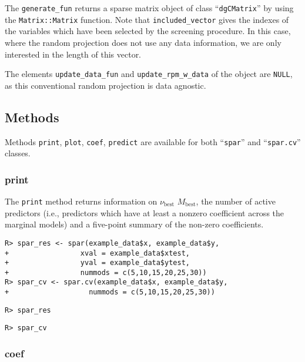 \documentclass[
  article]{jss}
\begin{document}
The \texttt{generate\_fun} returns a sparse matrix object of class
``\texttt{dgCMatrix}'' by using the \texttt{Matrix::Matrix} function.
Note that \texttt{included\_vector} gives the indexes of the variables
which have been selected by the screening procedure. In this case, where
the random projection does not use any data information, we are only
interested in the length of this vector.

The elements \texttt{update\_data\_fun} and
\texttt{update\_rpm\_w\_data} of the object are \texttt{NULL}, as this
conventional random projection is data agnostic.

\subsection{Methods}\label{methods}

Methods \texttt{print}, \texttt{plot}, \texttt{coef}, \texttt{predict}
are available for both ``\texttt{spar}'' and ``\texttt{spar.cv}''
classes.

\subsubsection{print}\label{print}

The \texttt{print} method returns information on \(\nu_\text{best}\)
\(M_\text{best}\), the number of active predictors (i.e., predictors
which have at least a nonzero coefficient across the marginal models)
and a five-point summary of the non-zero coefficients.

\begin{verbatim}
R> spar_res <- spar(example_data$x, example_data$y,
+                 xval = example_data$xtest,
+                 yval = example_data$ytest,
+                 nummods = c(5,10,15,20,25,30))
R> spar_cv <- spar.cv(example_data$x, example_data$y,
+                   nummods = c(5,10,15,20,25,30))
\end{verbatim}

\begin{verbatim}
R> spar_res
\end{verbatim}

\begin{verbatim}
R> spar_cv
\end{verbatim}

\subsubsection{coef}\label{coef}
\end{document}
